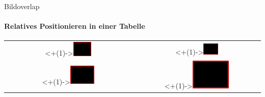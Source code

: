 \documentclass[
	12pt, 				%
	t,					%
	aspectratio=169,	%
	]{beamer}
\begin{document}
	
	\begin{frame}{Bildoverlap}
	\framesubtitle{Relatives Positionieren in einer Tabelle}
		\begin{center}%
		\begin{tabular}{cc}%
			\visible<+(1)->{\includegraphics[width = 0.15\textwidth]{figures/img1}}&
			\visible<+(1)->{\includegraphics[width = 0.12\textwidth]{figures/img1}} \\
			\visible<+(1)->{\includegraphics[width = 0.2\textwidth]{figures/img1}} &
			\visible<+(1)->{\includegraphics[width = 0.3\textwidth]{figures/img1}} \\
		\end{tabular}%
		\end{center}%
	\end{frame}
	
	
	\printbibliographyframe
	
\end{document}
